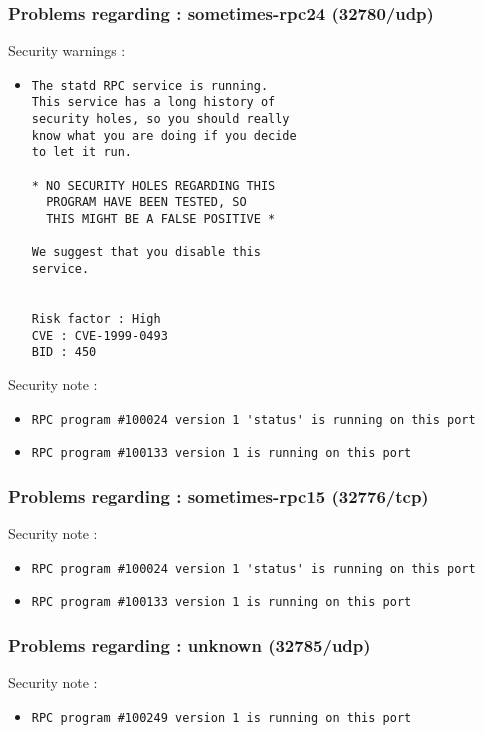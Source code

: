 \documentclass{article}
\begin{document}
\subsubsection{Problems regarding : sometimes-rpc24 (32780/udp)}
Security warnings :\\
\begin{itemize}
\item \begin{verbatim}
The statd RPC service is running. 
This service has a long history of 
security holes, so you should really
know what you are doing if you decide
to let it run.

* NO SECURITY HOLES REGARDING THIS
  PROGRAM HAVE BEEN TESTED, SO
  THIS MIGHT BE A FALSE POSITIVE *

We suggest that you disable this
service.


Risk factor : High
CVE : CVE-1999-0493
BID : 450
\end{verbatim}\end{itemize}
Security note :\\
\begin{itemize}
\item \begin{verbatim}
RPC program #100024 version 1 'status' is running on this port
\end{verbatim}\item \begin{verbatim}
RPC program #100133 version 1 is running on this port
\end{verbatim}\end{itemize}
\subsubsection{Problems regarding : sometimes-rpc15 (32776/tcp)}
Security note :\\
\begin{itemize}
\item \begin{verbatim}
RPC program #100024 version 1 'status' is running on this port
\end{verbatim}\item \begin{verbatim}
RPC program #100133 version 1 is running on this port
\end{verbatim}\end{itemize}
\subsubsection{Problems regarding : unknown (32785/udp)}
Security note :\\
\begin{itemize}
\item \begin{verbatim}
RPC program #100249 version 1 is running on this port
\end{verbatim}\end{itemize}
\end{document}
